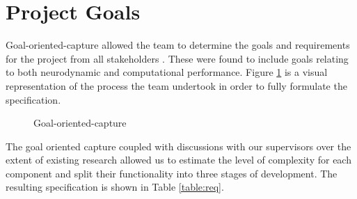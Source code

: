 \section{Project Goals}

\par Goal-oriented-capture allowed the team to determine the goals and requirements for the project from all stakeholders . These were found to include goals relating to both neurodynamic and computational performance. Figure \ref{goc} is a visual representation of the process the team undertook in order to fully formulate the specification. 

\begin{figure}[b!]
  \centering
  \caption{Goal-oriented-capture}
  \label{goc}
\end{figure}

\newpage

\par The goal oriented capture coupled with discussions with our supervisors over the extent of existing research allowed us to estimate the level of complexity for each component and split their functionality into three stages of development. The resulting specification is shown in Table \ref{table:req}.

